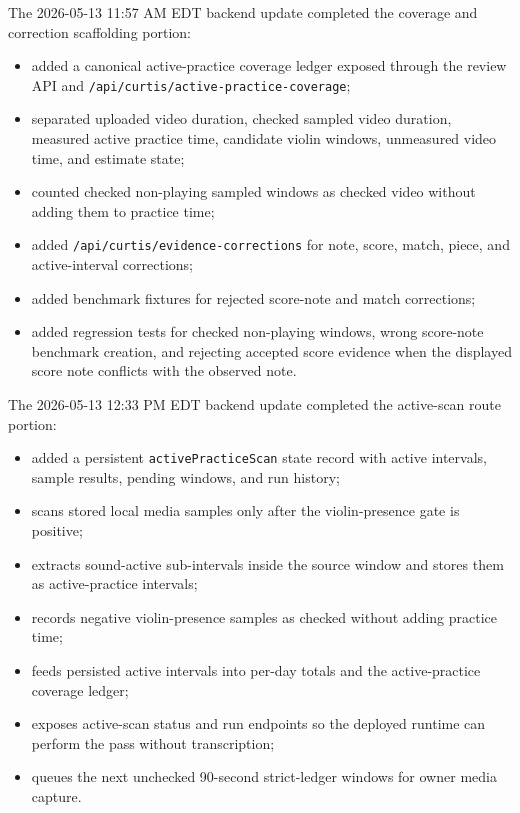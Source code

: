 The 2026-05-13 11:57 AM EDT backend update completed the coverage and correction scaffolding portion:
\begin{itemize}
    \item added a canonical active-practice coverage ledger exposed through the review API and \texttt{/api/curtis/active-practice-coverage};
    \item separated uploaded video duration, checked sampled video duration, measured active practice time, candidate violin windows, unmeasured video time, and estimate state;
    \item counted checked non-playing sampled windows as checked video without adding them to practice time;
    \item added \texttt{/api/curtis/evidence-corrections} for note, score, match, piece, and active-interval corrections;
    \item added benchmark fixtures for rejected score-note and match corrections;
    \item added regression tests for checked non-playing windows, wrong score-note benchmark creation, and rejecting accepted score evidence when the displayed score note conflicts with the observed note.
\end{itemize}

The 2026-05-13 12:33 PM EDT backend update completed the active-scan route portion:
\begin{itemize}
    \item added a persistent \texttt{activePracticeScan} state record with active intervals, sample results, pending windows, and run history;
    \item scans stored local media samples only after the violin-presence gate is positive;
    \item extracts sound-active sub-intervals inside the source window and stores them as active-practice intervals;
    \item records negative violin-presence samples as checked without adding practice time;
    \item feeds persisted active intervals into per-day totals and the active-practice coverage ledger;
    \item exposes active-scan status and run endpoints so the deployed runtime can perform the pass without transcription;
    \item queues the next unchecked 90-second strict-ledger windows for owner media capture.
\end{itemize}

